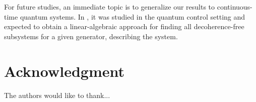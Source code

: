 \documentclass[journal]{IEEEtran}
\begin{document}
For future studies, an immediate topic is to generalize our results to continuous-time quantum systems. In \cite{ticozzi2008quantum}, it was studied in the quantum control setting and expected to obtain a linear-algebraic approach for finding all decoherence-free subsystems  for a given generator, describing the system.
\section*{Acknowledgment}


The authors would like to thank...










%
%
%


% 
\end{document}
